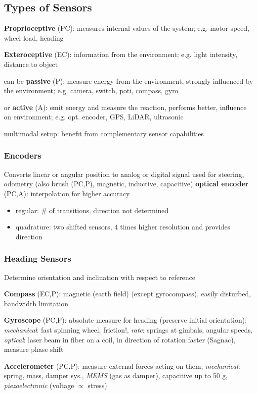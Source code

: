 \documentclass[fontsize=6pt]{scrartcl}
\begin{document}
\begin{multicols*}{4}
\subsection*{Types of Sensors}
\textbf{Proprioceptive} (PC): measures internal values of the system; e.g. motor speed, wheel load, heading

\textbf{Exteroceptive} (EC): information from the environment; e.g. light intensity, distance to object

can be \textbf{passive} (P): measure energy from the environment, strongly influenced by the environment; e.g. camera, switch, poti, compass, gyro

or \textbf{active} (A): emit energy and measure the reaction, performs better, influence on environment; e.g. opt. encoder, GPS, LiDAR, ultrasonic

multimodal setup: benefit from complementary sensor capabilities

\subsubsection*{Encoders}
Converts linear or angular position to analog or digital signal used for steering, odometry (also brush (PC,P), magnetic, inductive, capacitive)
\textbf{optical encoder} (PC,A): interpolation for higher accuracy
\begin{itemize}
	\item regular: \# of transitions, direction not determined
	\item quadrature: two shifted sensors, 4 times higher resolution and provides direction
\end{itemize}

\subsubsection*{Heading Sensors}
Determine orientation and inclination with respect to reference

\textbf{Compass} (EC,P): magnetic (earth field) (except gyrocompass), easily disturbed, bandwidth limitation

\textbf{Gyroscope} (PC,P): absolute measure for heading (preserve initial orientation); \textit{mechanical}: fast spinning wheel, friction!, \textit{rate}: springs at gimbals, angular speeds, \textit{optical}: laser beam in fiber on a coil, in direction of rotation faster (Sagnac), measure phase shift

\textbf{Accelerometer} (PC,P): measure external forces acting on them; \textit{mechanical}: spring, mass, damper sys., \textit{MEMS} (gas as damper), capacitive up to 50 g, \textit{piezoelectronic} (voltage $\propto$ stress)


\end{multicols*}
\end{document}

